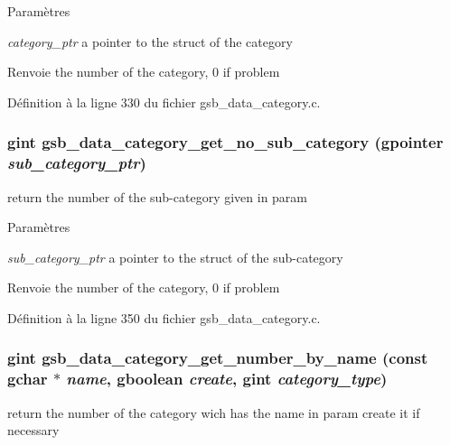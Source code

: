 \begin{DoxyParams}{Paramètres}
\item[{\em category\_\-ptr}]a pointer to the struct of the category\end{DoxyParams}
\begin{DoxyReturn}{Renvoie}
the number of the category, 0 if problem 
\end{DoxyReturn}


Définition à la ligne 330 du fichier gsb\_\-data\_\-category.c.

\subsubsection[{gsb\_\-data\_\-category\_\-get\_\-no\_\-sub\_\-category}]{\setlength{\rightskip}{0pt plus 5cm}gint gsb\_\-data\_\-category\_\-get\_\-no\_\-sub\_\-category (gpointer {\em sub\_\-category\_\-ptr})}\label{gsb__data__category_8c_a55a6b25f3fe1e0c08f603308ab091d97}
return the number of the sub-\/category given in param


\begin{DoxyParams}{Paramètres}
\item[{\em sub\_\-category\_\-ptr}]a pointer to the struct of the sub-\/category\end{DoxyParams}
\begin{DoxyReturn}{Renvoie}
the number of the category, 0 if problem 
\end{DoxyReturn}


Définition à la ligne 350 du fichier gsb\_\-data\_\-category.c.

\subsubsection[{gsb\_\-data\_\-category\_\-get\_\-number\_\-by\_\-name}]{\setlength{\rightskip}{0pt plus 5cm}gint gsb\_\-data\_\-category\_\-get\_\-number\_\-by\_\-name (const gchar $\ast$ {\em name}, \/  gboolean {\em create}, \/  gint {\em category\_\-type})}\label{gsb__data__category_8c_a0829907fff4f8dda3487debb5f2cc43f}
return the number of the category wich has the name in param create it if necessary


